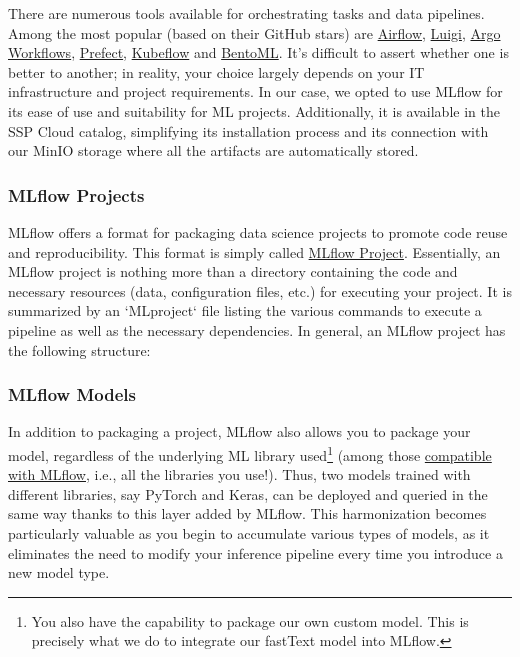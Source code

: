 There are numerous tools available for orchestrating tasks and data pipelines. Among the most popular (based on their GitHub stars) are \href{https://github.com/apache/airflow}{Airflow}, \href{https://github.com/spotify/luigi}{Luigi}, \href{https://github.com/argoproj/argo-workflows}{Argo Workflows}, \href{https://github.com/PrefectHQ/prefect}{Prefect}, \href{https://github.com/kubeflow/kubeflow}{Kubeflow} and \href{https://github.com/bentoml/BentoML}{BentoML}. It's difficult to assert whether one is better to another; in reality, your choice largely depends on your IT infrastructure and project requirements. In our case, we opted to use MLflow for its ease of use and suitability for ML projects. Additionally, it is available in the SSP Cloud catalog, simplifying its installation process and its connection with our MinIO storage where all the artifacts are automatically stored.

\subsubsection{MLflow Projects}

MLflow offers a format for packaging data science projects to promote code reuse and reproducibility. This format is simply called \href{https://MLflow.org/docs/latest/projects.html}{MLflow Project}. Essentially, an MLflow project is nothing more than a directory containing the code and necessary resources (data, configuration files, etc.) for executing your project. It is summarized by an `MLproject` file listing the various commands to execute a pipeline as well as the necessary dependencies. In general, an MLflow project has the following structure:



\subsubsection{MLflow Models}

In addition to packaging a project, MLflow also allows you to package your model, regardless of the underlying ML library used\footnote{You also have the capability to package our own custom model. This is precisely what we do to integrate our fastText model into MLflow.}  (among those \href{https://MLflow.org/docs/latest/models.html#built-in-model-flavors}{compatible with MLflow}, i.e., all the libraries you use!). Thus, two models trained with different libraries, say PyTorch and Keras, can be deployed and queried in the same way thanks to this layer added by MLflow. This harmonization becomes particularly valuable as you begin to accumulate various types of models, as it eliminates the need to modify your inference pipeline every time you introduce a new model type.

